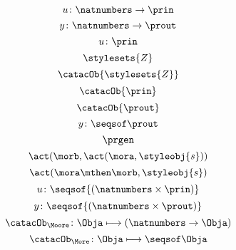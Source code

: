{\begin{forslides}
        \begin{equation}
            \label{eq:prgen-u-1}
            u\colon \natnumbers \to \prin
        \end{equation}
        \begin{equation}
            \label{eq:prgen-y-1}
            y\colon \natnumbers \to \prout
        \end{equation}
        \begin{equation}
            \label{eq:prgen-u-2}
            u\colon \prin
        \end{equation}
        \begin{equation}
            \label{eq:Z}
            \stylesets{Z}
        \end{equation}
        \begin{equation}
            \label{eq:Za}
            \catacOb{\stylesets{Z}}
        \end{equation}
        \begin{equation}
            \label{eq:Ua}
            \catacOb{\prin}
        \end{equation}
        \begin{equation}
            \label{eq:Ya}
            \catacOb{\prout}
        \end{equation}
        \begin{equation}
            \label{eq:prgen-y-2}
            y\colon \seqsof  \prout
        \end{equation}
        \begin{equation}
            \label{eq:prgen}
            \prgen
        \end{equation}
        \begin{equation}
            \label{eq:now1}
            \act(\morb, \act(\mora, \styleobj{s}))
        \end{equation}
        \begin{equation}
            \label{eq:now2}
            \act(\mora\mthen\morb, \styleobj{s})
        \end{equation}
        \begin{equation}
            \label{eq:ev-sign}
            u\colon \seqsof{(\natnumbers \times \prin)}
        \end{equation}
        \begin{equation}
            \label{eq:ev-sign2}
            y\colon \seqsof{(\natnumbers \times \prout)}
        \end{equation}
        \begin{equation}
            \label{eq:phi-moore}
            {\catacOb_{\Moore}}\colon{\Obja}\longmapsto{(\natnumbers \to \Obja)}
        \end{equation}
        \begin{equation}
            \label{eq:phi-more}
            {\catacOb_{\More}}\colon{\Obja}\longmapsto{\seqsof \Obja}
        \end{equation}
    \end{forslides}
}
